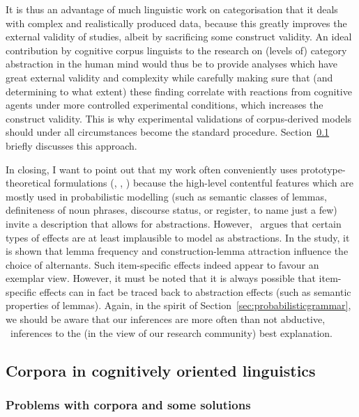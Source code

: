 It is thus an advantage of much linguistic work on categorisation that it deals with complex and realistically produced data, because this greatly improves the external validity of studies, albeit by sacrificing some construct validity.
An ideal contribution by cognitive corpus linguists to the research on (levels of) category abstraction in the human mind would thus be to provide analyses which have great external validity and complexity while carefully making sure that (and determining to what extent) these finding correlate with reactions from cognitive agents under more controlled experimental conditions, which increases the construct validity.
This is why experimental validations of corpus-derived models should under all circumstances become the standard procedure.
Section~\ref{sec:corporaincognitivelyorientedlinguistics} briefly discusses this approach.

In closing, I want to point out that my work often conveniently uses prototype-theoretical formulations (\RAWeil, \RAWeakN, \RAMeasure) because the high-level contentful features which are mostly used in probabilistic modelling (such as semantic classes of lemmas, definiteness of noun phrases, discourse status, or register, to name just a few) invite a description that allows for abstractions.
However, \ROMeasure\ argues that certain types of effects are at least implausible to model as abstractions.
In the study, it is shown that lemma frequency and construction-lemma attraction influence the choice of alternants.
Such item-specific effects indeed appear to favour an exemplar view.
However, it must be noted that it is always possible that item-specific effects can in fact be traced back to abstraction effects (such as semantic properties of lemmas).
Again, in the spirit of Section~\ref{sec:probabilisticgrammar}, we should be aware that our inferences are more often than not abductive, \ie\ inferences to the (in the view of our research community) best explanation.



\subsection{Corpora in cognitively oriented linguistics}
\label{sec:corporaincognitivelyorientedlinguistics}

\subsubsection{Problems with corpora and some solutions}
\label{sec:problemswithcorporaandsomesolutions}

